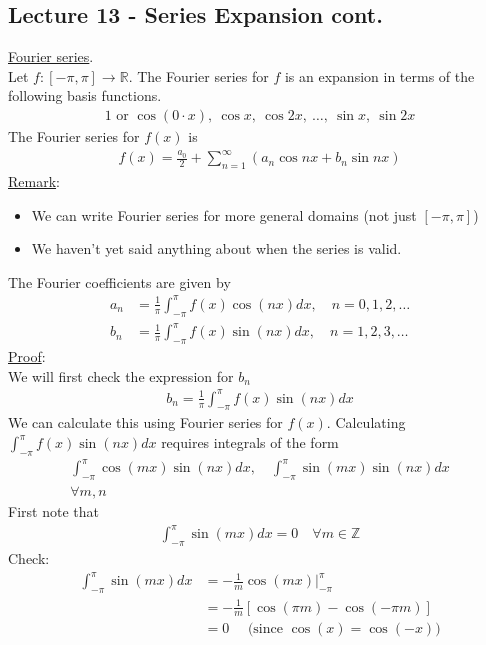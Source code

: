 \documentclass[12pt, letterpaper]{article}
\begin{document}
\subsection{Lecture 13 - Series Expansion cont.}
\underline{Fourier series}. \\
Let $f:[-\pi,\pi]\rightarrow \mathbb{R}$. The Fourier series for $f$ is an expansion in terms of 
the following basis functions.
\begin{align*}
    1 \text{ or } \cos(0\cdot x),\ \cos x,\ \cos 2x,\ \dots,\ \sin x,\ \sin 2x
\end{align*}
The Fourier series for $f(x)$ is 
\begin{align*}
    f(x) = \frac{a_0}{2} + \sum_{n=1}^{\infty}(a_n\cos nx + b_n \sin nx)
\end{align*}
\underline{Remark}: 
\begin{itemize}
    \item We can write Fourier series for more general domains (not just $[-\pi, \pi]$)
    \item We haven't yet said anything about when the series is valid.
\end{itemize}
The Fourier coefficients are given by
\begin{align*}
    a_n &= \frac{1}{\pi} \int_{-\pi}^{\pi} f(x)\cos(nx)dx,\quad n = 0,1,2,\dots \\
    b_n &= \frac{1}{\pi} \int_{-\pi}^{\pi} f(x)\sin(nx)dx,\quad n = 1,2,3,\dots
\end{align*}
\underline{Proof}: \\
We will first check the expression for $b_n$
\begin{align*}
    b_n = \frac 1\pi \int_{-\pi}^{\pi} f(x)\sin(nx)dx
\end{align*}
We can calculate this using Fourier series for $f(x)$. Calculating $\int_{-\pi}^{\pi}f(x)\sin(nx)dx$
requires integrals of the form
\begin{align*}
    \int_{-\pi}^{\pi}\cos(mx)\sin(nx)dx,\quad \int_{-\pi}^{\pi} \sin(mx)\sin(nx)dx \\
    \forall m,n
\end{align*}
First note that
\begin{align*}
    \int_{-\pi}^{\pi} \sin(mx)dx = 0 \quad \forall m \in \mathbb{Z}
\end{align*}
Check:
\begin{align*}
    \int_{-\pi}^{\pi}\sin(mx)dx &= -\frac{1}{m}\cos(mx) \Big|^\pi_{-\pi} \\
    &= -\frac{1}{m}[\cos(\pi m) - \cos(-\pi m)] \\
    &= 0\quad \text{ (since } \cos(x) = \cos (-x))
\end{align*}
\end{document}
